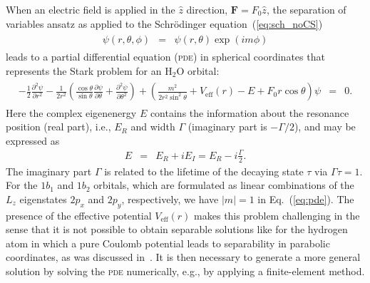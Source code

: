 When an electric field is applied in the $\hat{z}$ direction,
$\mathbf{F} = F_{0}\hat{z}$, the separation of variables ansatz as
applied to the Schr\"{o}dinger equation~(\ref{eq:sch_noCS})
%
\begin{eqnarray}
  \begin{split}
    \psi(r,\theta,\phi) & = & \psi(r,\theta)\exp(im\phi)
  \end{split}
\label{eq:sov}
\end{eqnarray}
%
leads to a partial differential equation (\textsc{pde}) in spherical
coordinates that represents the Stark problem for an H$_{2}$O orbital:
%
\begin{eqnarray}
 \begin{split}
  -\frac{1}{2} \frac{\partial^{2}\psi}{\partial r^2} - \frac{1}{2r^2}
  (\frac{\cos\theta}{\sin\theta} \frac{\partial\psi}{\partial\theta} + 
  \frac{\partial^2\psi}{\partial\theta^2})
  + (\frac{m^2}{2r^2 \sin^2\theta} + V_{\mathrm{eff}}(r) - E +
  F_{0}r\cos\theta)\psi & = & 0.
  \end{split}
\label{eq:pde}
\end{eqnarray}
%
Here the complex eigenenergy $E$ contains the information about the
resonance position (real part), i.e., $E_{R}$ and width $\Gamma$
(imaginary part is $-\Gamma/2$), and may be expressed as
%
\begin{eqnarray}
E & = & E_{R} + iE_{I} = E_{R} - i\frac{\Gamma}{2}.
\label{eq:complex_E}
\end{eqnarray}
%
The imaginary part $\Gamma$ is related to the lifetime of the decaying
state $\tau$ via $\Gamma\tau = 1$. For the $1b_{1}$ and $1b_{2}$
orbitals, which are formulated as linear combinations of the $L_{z}$
eigenstates $2p_{x}$ and $2p_{y}$, respectively, we have $|m| = 1$ in
Eq.~(\ref{eq:pde}). The presence of the effective potential
$V_{\mathrm{eff}}(r)$ makes this problem challenging in the sense that
it is not possible to obtain separable solutions like for the hydrogen
atom in which a pure Coulomb potential leads to separability in
parabolic coordinates, as was discussed in~\cite{Telnov_1989}. It is
then necessary to generate a more general solution by solving the
\textsc{pde} numerically, e.g., by applying a finite-element method.

